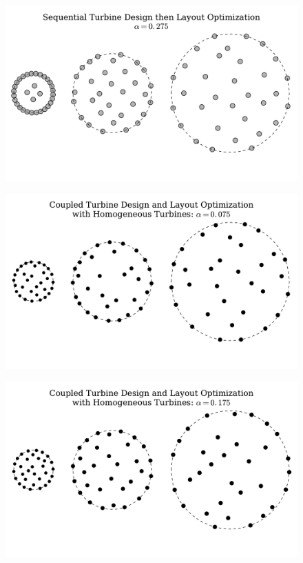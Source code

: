 \begin{figure}[htbp]
  \centering
  \includegraphics[width=\textwidth]{Figures/CircleLayoutS_0_275.pdf}
  \caption{\label{circ275S}}
\end{figure}


\begin{figure}[htbp]
  \centering
  \Large{}
  \includegraphics[width=\textwidth]{Figures/CircleLayoutALL1_0_075.pdf}
  \caption{\label{circ75A1}}
\end{figure}

\begin{figure}[htbp]
  \centering
  \includegraphics[width=\textwidth]{Figures/CircleLayoutALL1_0_175.pdf}
  \caption{\label{circ175A1}}
\end{figure}

